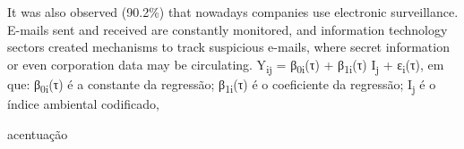 \par It was also observed (90.2\%) that nowadays companies use electronic surveillance. E-mails sent and received are constantly monitored, and information technology sectors created mechanisms to track suspicious e-mails, where secret information or even corporation data may be circulating. Y\textsubscript{ij} = β\textsubscript{0i}(τ) + β\textsubscript{1i}(τ) I\textsubscript{j} + ε\textsubscript{i}(τ), em que: β\textsubscript{0i}(τ) é a constante da regressão; β\textsubscript{1i}(τ) é o coeficiente da regressão; I\textsubscript{j} é o índice ambiental codificado,

\par acentuação
